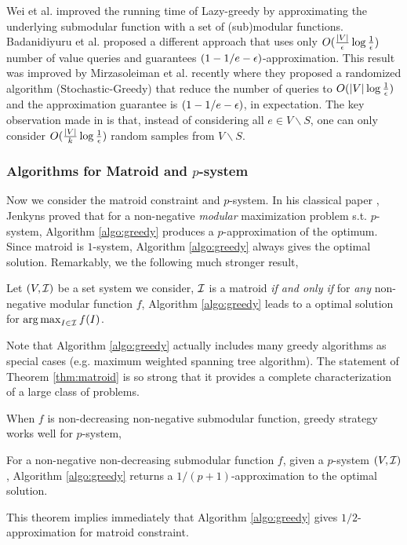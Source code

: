 Wei et al. \cite{WIB14} improved the running time of {\sc Lazy-greedy} by approximating the underlying submodular function with a set of (sub)modular functions. Badanidiyuru et al. \cite{BV14} proposed a different approach that uses only $O(\frac{|V|}{\epsilon}\log \frac{1}{\epsilon})$ number of value queries and guarantees $(1 - 1/e - \epsilon)$-approximation. This result was improved by Mirzasoleiman et al. \cite{MBK+15} recently where they proposed a randomized algorithm ({\sc Stochastic-Greedy}) that reduce the number of queries to  $O(|V| \log \frac{1}{\epsilon})$ and the approximation guarantee is $(1 - 1/e - \epsilon)$, in expectation. The key observation made in \cite{MBK+15} is that, instead of considering all $e\in V\backslash S$, one can only consider $O(\frac{|V|}{k}\log \frac{1}{\epsilon})$  random samples from $V\backslash S$. 



 







\subsubsection{Algorithms for Matroid and $p$-system}
Now we consider the matroid constraint and $p$-system. In his classical paper \cite{J76}, Jenkyns proved that for a non-negative \emph{modular} maximization problem s.t. $p$-system, Algorithm \ref{algo:greedy} produces a $p$-approximation of the optimum. Since matroid is $1$-system, Algorithm \ref{algo:greedy} always gives the optimal solution. Remarkably, we the following much stronger result, 

\begin{theorem}
  \label{thm:matroid}
  Let $(V, \mathcal{I})$ be a set system we consider, $\mathcal{I}$ is a matroid \emph{if and only if} for \emph{any} non-negative modular function $f$, Algorithm \ref{algo:greedy} leads to a optimal solution for $\operatorname*{arg\,max}_{I\in \mathcal{I}} f(I)$.
\end{theorem}
Note that Algorithm \ref{algo:greedy} actually includes many greedy algorithms as special cases (e.g. maximum weighted spanning tree algorithm). The statement of Theorem \ref{thm:matroid} is so strong that it provides a complete  characterization of a large class of problems.

When $f$ is non-decreasing non-negative submodular function, greedy strategy works well for $p$-system,
\begin{theorem}
  \label{thm:}
  For a non-negative non-decreasing submodular function $f$, given a $p$-system $(V, \mathcal{I})$, Algorithm \ref{algo:greedy} returns a $1/(p + 1)$-approximation to the optimal solution.
\end{theorem}
This theorem implies immediately that Algorithm \ref{algo:greedy} gives $1/2$-approximation for matroid constraint. 

